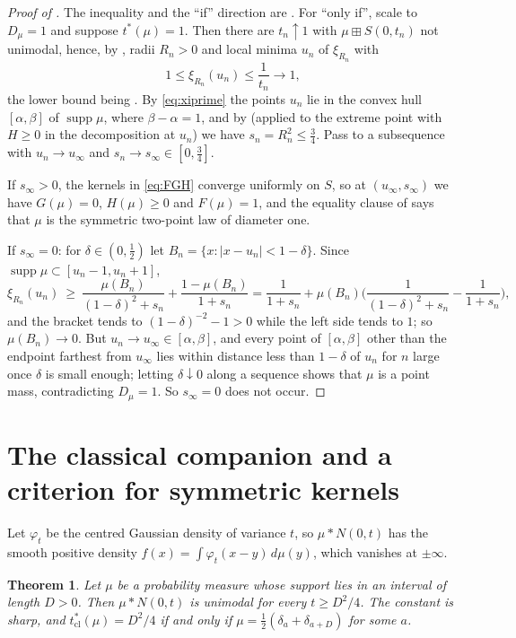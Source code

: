 \documentclass[11pt]{amsart}
\newtheorem{theorem}{Theorem}[section]
\theoremstyle{definition}
\newcommand{\bp}{\boxplus}
\newcommand{\supp}{\operatorname{supp}}
\begin{document}
\begin{proof}[Proof of ]
The inequality and the ``if'' direction are . For ``only if'', scale to $D_\mu=1$ and suppose $t^*(\mu)=1$. Then there are $t_n\uparrow1$ with $\mu\bp S(0,t_n)$ not unimodal, hence, by , radii $R_n>0$ and local minima $u_n$ of $\xi_{R_n}$ with
\[
1\le\xi_{R_n}(u_n)\le\frac1{t_n}\to1,
\]
the lower bound being . By \eqref{eq:xiprime} the points $u_n$ lie in the convex hull $[\alpha,\beta]$ of $\supp\mu$, where $\beta-\alpha=1$, and by  (applied to the extreme point with $H\ge0$ in the decomposition at $u_n$) we have $s_n=R_n^2\le\frac34$. Pass to a subsequence with $u_n\to u_\infty$ and $s_n\to s_\infty\in[0,\frac34]$.

If $s_\infty>0$, the kernels in \eqref{eq:FGH} converge uniformly on $S$, so at $(u_\infty,s_\infty)$ we have $G(\mu)=0$, $H(\mu)\ge0$ and $F(\mu)=1$, and the equality clause of  says that $\mu$ is the symmetric two-point law of diameter one.

If $s_\infty=0$: for $\delta\in(0,\frac12)$ let $B_n=\{x:|x-u_n|<1-\delta\}$. Since $\supp\mu\subset[u_n-1,u_n+1]$,
\[
\xi_{R_n}(u_n)\ \ge\ \frac{\mu(B_n)}{(1-\delta)^2+s_n}+\frac{1-\mu(B_n)}{1+s_n}
=\frac1{1+s_n}+\mu(B_n)\Big(\frac1{(1-\delta)^2+s_n}-\frac1{1+s_n}\Big),
\]
and the bracket tends to $(1-\delta)^{-2}-1>0$ while the left side tends to $1$; so $\mu(B_n)\to0$. But $u_n\to u_\infty\in[\alpha,\beta]$, and every point of $[\alpha,\beta]$ other than the endpoint farthest from $u_\infty$ lies within distance less than $1-\delta$ of $u_n$ for $n$ large once $\delta$ is small enough; letting $\delta\downarrow0$ along a sequence shows that $\mu$ is a point mass, contradicting $D_\mu=1$. So $s_\infty=0$ does not occur.
\end{proof}

\section{The classical companion and a criterion for symmetric kernels}\label{sec:classical}

Let $\varphi_t$ be the centred Gaussian density of variance $t$, so $\mu*N(0,t)$ has the smooth positive density $f(x)=\int\varphi_t(x-y)\,d\mu(y)$, which vanishes at $\pm\infty$.

\begin{theorem}\label{thm:classical}
Let $\mu$ be a probability measure whose support lies in an interval of length $D>0$. Then $\mu*N(0,t)$ is unimodal for every $t\ge D^2/4$. The constant is sharp, and $t^*_{\mathrm{cl}}(\mu)=D^2/4$ if and only if $\mu=\frac12(\delta_a+\delta_{a+D})$ for some $a$.
\end{theorem}
\end{document}
